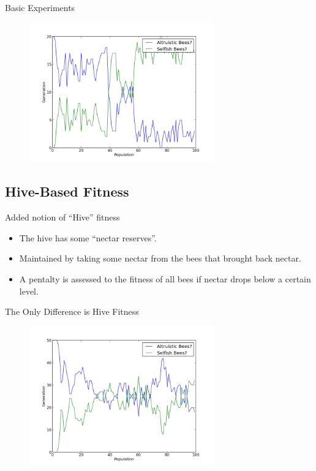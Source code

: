 \documentclass{beamer}
\begin{document}
    \begin{frame}{Basic Experiments}
        \begin{figure}
            
        \includegraphics[width=8cm]{s_bees.png}
        \end{figure}

    \end{frame}

    \subsection{Hive-Based Fitness}

    \begin{frame}{Added notion of ``Hive'' fitness}
        \begin{itemize}
            \item The hive has some ``nectar reserves''.
            \item Maintained by taking some nectar from the bees that brought back nectar.
            \item A pentalty is assessed to the fitness of all bees if nectar drops below a certain 
                  level.
        \end{itemize}
    \end{frame}


    \begin{frame}{The Only Difference is Hive Fitness}
        \begin{figure}
            
        \includegraphics[width=8cm]{hive_influenced_bees.png}
        \end{figure}
    
    \end{frame}
\end{document}
